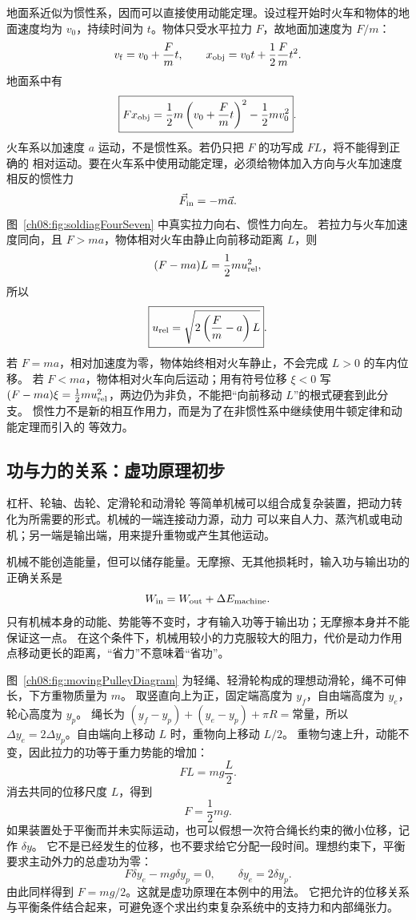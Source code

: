 {\begin{xesolution}
地面系近似为惯性系，因而可以直接使用动能定理。设过程开始时火车和物体的地面速度均为
$v_0$，持续时间为 $t$。物体只受水平拉力 $F$，故地面加速度为 $F/m$：
\[
 v_{\rm f}=v_0+\frac{F}{m}t,
 \qquad
 x_{\rm obj}=v_0t+\frac12\frac{F}{m}t^2.
\]
地面系中有
\[
 \boxed{
 Fx_{\rm obj}
 =\frac12m\left(v_0+\frac{F}{m}t\right)^2-\frac12mv_0^2}.
\]
火车系以加速度 $a$ 运动，不是惯性系。若仍只把 $F$ 的功写成 $FL$，将不能得到正确的
相对运动。要在火车系中使用动能定理，必须给物体加入方向与火车加速度相反的惯性力
\[
 \vec F_{\rm in}=-m\vec a.
\]
\soldiagFourSeven
图~\ref{ch08:fig:soldiagFourSeven} 中真实拉力向右、惯性力向左。
若拉力与火车加速度同向，且 $F>ma$，物体相对火车由静止向前移动距离 $L$，则
\[
 (F-ma)L=\frac12mu_{\rm rel}^2,
\]
所以
\[
 \boxed{u_{\rm rel}
 =\sqrt{2\left(\frac{F}{m}-a\right)L}}.
\]
若 $F=ma$，相对加速度为零，物体始终相对火车静止，不会完成 $L>0$ 的车内位移。
若 $F<ma$，物体相对火车向后运动；用有符号位移 $\xi<0$ 写
$(F-ma)\xi=\tfrac12mu_{\rm rel}^2$，两边仍为非负，不能把“向前移动 $L$”的根式硬套到此分支。
惯性力不是新的相互作用力，而是为了在非惯性系中继续使用牛顿定律和动能定理而引入的
等效力。
\end{xesolution}

\subsection{功与力的关系：虚功原理初步}

杠杆、轮轴、齿轮、定滑轮和动滑轮
等简单机械可以组合成复杂装置，把动力转化为所需要的形式。机械的一端连接动力源，动力
可以来自人力、蒸汽机或电动机；另一端是输出端，用来提升重物或产生其他运动。

机械不能创造能量，但可以储存能量。无摩擦、无其他损耗时，输入功与输出功的正确关系是
\[
 W_{\rm in}=W_{\rm out}+\Delta E_{\rm machine}.
\]
只有机械本身的动能、势能等不变时，才有输入功等于输出功；无摩擦本身并不能保证这一点。
在这个条件下，机械用较小的力克服较大的阻力，代价是动力作用点移动更长的距离，“省力”不意味着“省功”。

图~\ref{ch08:fig:movingPulleyDiagram} 为轻绳、轻滑轮构成的理想动滑轮，绳不可伸长，下方重物质量为 $m$。
取竖直向上为正，固定端高度为 $y_f$，自由端高度为 $y_e$，轮心高度为 $y_p$。
绳长为 $(y_f-y_p)+(y_e-y_p)+\pi R=\text{常量}$，所以
$\Delta y_e=2\Delta y_p$。自由端向上移动 $L$ 时，重物向上移动 $L/2$。
重物匀速上升，动能不变，因此拉力的功等于重力势能的增加：
\movingPulleyDiagram
\begin{equation}
 F L=mg\frac{L}{2}.
\end{equation}
消去共同的位移尺度 $L$，得到
\begin{equation}
 F=\frac12mg.
\end{equation}
如果装置处于平衡而并未实际运动，也可以假想一次符合绳长约束的微小位移，记作 $\delta y$。
它不是已经发生的位移，也不要求给它分配一段时间。理想约束下，平衡要求主动外力的总虚功为零：
\[
 F\delta y_e-mg\delta y_p=0,\qquad \delta y_e=2\delta y_p.
\]
由此同样得到 $F=mg/2$。这就是虚功原理在本例中的用法。
它把允许的位移关系与平衡条件结合起来，可避免逐个求出约束复杂系统中的支持力和内部绳张力。

}
